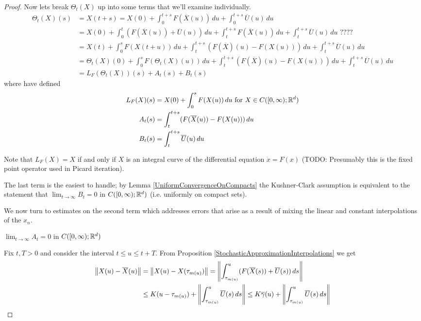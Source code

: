 \begin{proof}
Now lets break $\Theta_t (X)$ up into some terms that we'll examine individually.
\begin{align}\label{KushnerClarkImpliesPseudotrajectory:TranslationTerms}
\Theta_t(X)(s) &= X(t+s) = X(0) + \int_0^{t+s} F(\overline{X}(u)) \, du + \int_0^{t+s} \overline{U}(u) \, du \\
&=X(0) + \int_0^{t} (F(\overline{X}(u)) + \overline{U}(u) ) \, du + \int_t^{t+s} F(\overline{X}(u)) \, du + \int_t^{t+s} \overline{U}(u) \, du \text{ ????} \\
&=X(t) + \int_0^s F(X(t+u)) \, du + \int_t^{t+s} (F(\overline{X})(u) - F(X(u))) \, du + \int_t^{t+s} \overline{U}(u) \, du \\
&=\Theta_t(X)(0) + \int_0^s F(\Theta_t(X)(u)) \, du + \int_t^{t+s} (F(\overline{X})(u) - F(X(u))) \, du + \int_t^{t+s} \overline{U}(u) \, du \\
&=L_F(\Theta_t(X))(s) + A_t(s) + B_t(s)
\end{align}
where have defined
\begin{align*}
L_F(X)(s) &= X(0) + \int_0^s F(X(u)) \, du \text{ for $X \in C([0,\infty); \mathbb{R}^d)$} \\ 
A_t(s) &= \int_t^{t+s} (F(\overline{X}(u)) - F(X(u))) \, du \\
B_t(s) &=  \int_t^{t+s} \overline{U}(u) \, du 
\end{align*}

Note that $L_F(X) = X$ if and only if $X$ is an integral curve of the differential equation $\dot{x} = F(x)$ (TODO: Presumably this is the fixed point operator used in Picard iteration).

The last term is the easiest to handle;  by Lemma \ref{UniformConvergenceOnCompacts} the Kushner-Clark assumption is equivalent to the statement that $\lim_{t \to \infty} B_t = 0$ in $C([0,\infty); \mathbb{R}^d)$ (i.e. uniformly on compact sets).

We now turn to estimates on the second term which addresses errors that arise as a result of mixing the linear and constant interpolations of the $x_n$.
\begin{clm} $\lim_{t \to \infty} A_t = 0$ in $C([0,\infty); \mathbb{R}^d)$
\end{clm}
Fix $t,T > 0$  and consider the interval $t \leq u \leq t+T$.  From Proposition \ref{StochasticApproximationInterpolations}  we get
\begin{align*}
\left \lVert X(u) - \overline{X}(u) \right \rVert &= \left \lVert X(u) - X(\tau_{m(u)}) \right \rVert = \left \lVert \int_{\tau_{m(u)}}^u (F(\overline{X}(s)) + \overline{U}(s)) \, ds \right \rVert \\
&\leq K (u - \tau_{m(u)}) + \left \lVert \int_{\tau_{m(u)}}^u \overline{U}(s) \, ds \right \rVert \leq K \overline{\gamma}(u) + \left \lVert \int_{\tau_{m(u)}}^u \overline{U}(s) \, ds \right \rVert 
\end{align*}


\end{proof}

